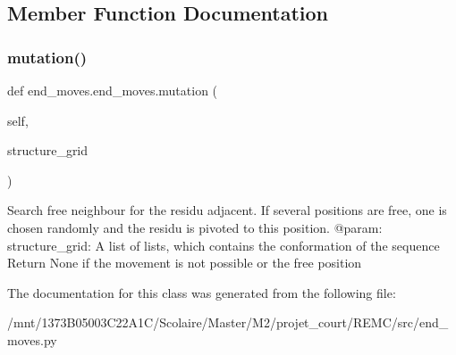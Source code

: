 \subsection{Member Function Documentation}
\mbox{\label{classend__moves_1_1end__moves_a00ac085203fdadc358c917e4928516c1}} 
\subsubsection{\texorpdfstring{mutation()}{mutation()}}
{\footnotesize\ttfamily def end\+\_\+moves.\+end\+\_\+moves.\+mutation (\begin{DoxyParamCaption}\item[{}]{self,  }\item[{}]{structure\+\_\+grid }\end{DoxyParamCaption})}

\begin{DoxyVerb}Search free neighbour for the residu adjacent.
If several positions are free, one is chosen randomly and the residu
is pivoted to this position.
    @param: structure_grid: A list of lists, which contains the
                   conformation of the sequence
    Return None if the movement is not possible or the free position
\end{DoxyVerb}
 

The documentation for this class was generated from the following file\+:\begin{DoxyCompactItemize}
\item 
/mnt/1373\+B05003\+C22\+A1\+C/\+Scolaire/\+Master/\+M2/projet\+\_\+court/\+R\+E\+M\+C/src/end\+\_\+moves.\+py\end{DoxyCompactItemize}
